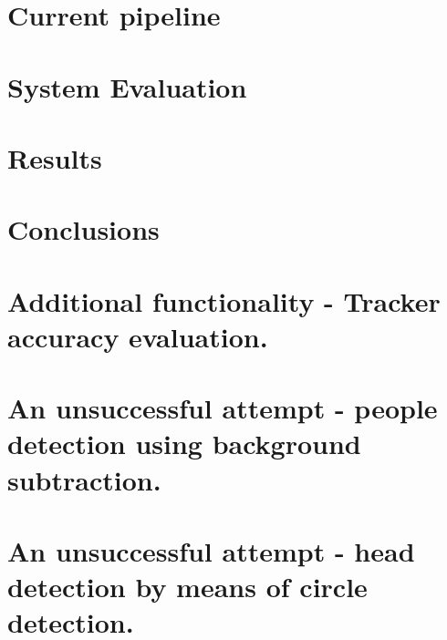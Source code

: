\documentclass[10pt, a4paper, twoside]{article}
\numberwithin{equation}{subsection}
\numberwithin{figure}{section}
\numberwithin{table}{section}
\begin{document}
\newpage
\section{Current pipeline}
\label{sec:current_pipeline}


\newpage
\section{System Evaluation}
\label{sec:evaluation}


\newpage
\section{Results}
\label{sec:results}


\newpage
\section{Conclusions}
\label{sec:conclusions}


\newpage
\appendix
{} %

\section{Additional functionality - Tracker accuracy evaluation.}
\label{sec:tracker_evaluation}

\newpage

\section{An unsuccessful attempt - people detection using background subtraction.}
\label{sec:bg_subtraction}

\newpage

\section{An unsuccessful attempt - head detection by means of circle detection.}
\label{sec:hough_circles}

\newpage

%
%

\thispagestyle{fancy}
\mbox{}

\end{document}
